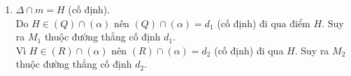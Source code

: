 \begin{bt}
\begin{bt}
{\begin{enumerate}
\begin{enumerate}[TH1.]
				Do đó $M_1$ thuộc đường thẳng cố định $d_1$ đi qua $C$ và song song với $\Delta$ ( và $m$).\\
				Lại có, theo giả thiết $MS_2$ luôn phải cắt $(\alpha)$ tại $M_2$, nên $(R) \cap (\alpha)=d_2$.\\
				Do $\Delta \parallel (\alpha)$, nên $SS_2$ cắt $(\alpha)$. Gọi $SS_2 \cap (\alpha)=D$ cố định.\\
				Ta có $C \in (R) \cap (\alpha)$ và $\Delta \subset (R),m \subset (\alpha)$. Mà $\Delta \parallel m$ nên $(R) \cap (\alpha)=d_2$ và $d_2$ đi qua $D$ và $d_2\parallel \Delta\parallel m$.\\
				Do đó $M_2$ thuộc đường thẳng cố định $d_2$ đi qua $D$ và song song với $\Delta$ (và $m$).
				\item $\Delta \cap m=H$ (cố định).\\
				Do $H \in (Q) \cap (\alpha)$ nên $(Q) \cap (\alpha)=d_1$ (cố định) đi qua điểm $H$. Suy ra $M_1$ thuộc đường thẳng cố định $d_1$.\\
				Vì $H \in (R) \cap (\alpha)$ nên $(R) \cap (\alpha)=d_2$ (cố định) đi qua $H$. Suy ra $M_2$ thuộc đường thẳng cố định $d_2$.
			\end{enumerate}
		\end{enumerate}
	}
\end{bt}


\end{bt}
